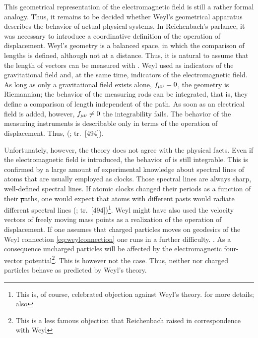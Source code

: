 \documentclass[submitted]{article}
\newcommand{\faradaymn}{\ensuremath{f\mn}}
\renewcommand{\rzlap}[2]{(\cite[#1]{Reichenbach1928}; tr.\ [#2])\xspace}
\begin{document}
This geometrical representation of the electromagnetic field is still a rather formal analogy. Thus, it remains to be decided whether Weyl's geometrical apparatus describes the behavior of actual physical systems. In Reichenbach's parlance, it was necessary to introduce a coordinative definition of the operation of displacement. Weyl's geometry is a balanced space, in which the comparison of lengths is defined, although not at a distance. Thus, it is natural to assume that the length of vectors can be measured with \rac. Weyl used \rac as indicators of the gravitational field and, at the same time, indicators of the electromagnetic field. As long as only a gravitational field exists alone, $\faradaymn=0$, the geometry is Riemannian; the behavior of the measuring rods can be integrated, that is, they define a comparison of length independent of the path. As soon as an electrical field is added, however, $\faradaymn\neq 0$ the integrability fails. The behavior of the measuring instruments is describable only in terms of the operation of displacement. Thus,  \rzlap{354}{494}. 

Unfortunately, however, the theory does not agree with the physical facts. Even if the electromagnetic field is introduced, the behavior of \rac is still integrable. This is confirmed by a large amount of experimental knowledge about spectral lines of atoms that are usually employed as clocks. Those spectral lines are always sharp, well-defined spectral lines. If atomic clocks changed their periods as a function of their \st paths, one would expect that atoms with different pasts would radiate different spectral lines \rzlap{355}{494}\footnote{This is, of course,  celebrated objection against Weyl's theory.  for more details; also }. Weyl might have also used the velocity vectors of freely moving mass points as a realization of the operation of displacement. If one assumes that charged particles moves on geodesics of the Weyl connection \cref{eq:weylconnection} one runs in a further difficulty. . As a consequence uncharged particles will be affected by the electromagnetic four-vector potential\footnote{This is a less famous objection that Reichenbach raised in correspondence with Weyl }. This is however not the case. Thus, neither \rac nor charged particles behave as predicted by Weyl's theory. 
\end{document}
